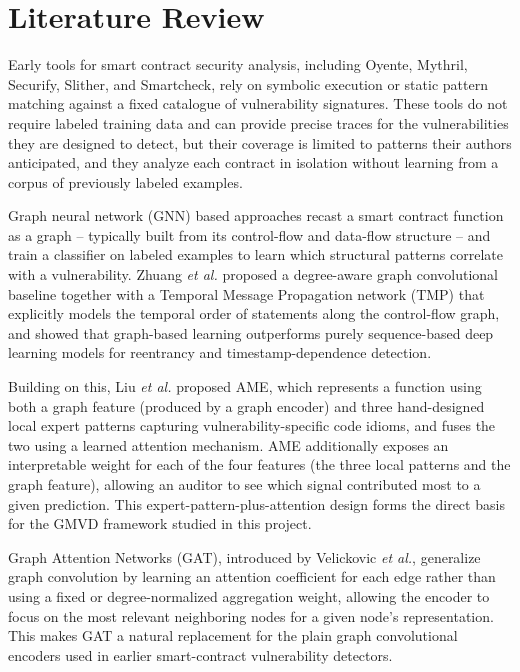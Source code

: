 \documentclass[12pt, a4paper, openright, twoside]{report}
\begin{document}
\chapter{Literature Review}
\label{literaturereview}
\vspace{3em}

Early tools for smart contract security analysis, including Oyente, Mythril, Securify, Slither, and Smartcheck, rely on symbolic execution or static pattern matching against a fixed catalogue of vulnerability signatures. These tools do not require labeled training data and can provide precise traces for the vulnerabilities they are designed to detect, but their coverage is limited to patterns their authors anticipated, and they analyze each contract in isolation without learning from a corpus of previously labeled examples.

Graph neural network (GNN) based approaches recast a smart contract function as a graph -- typically built from its control-flow and data-flow structure -- and train a classifier on labeled examples to learn which structural patterns correlate with a vulnerability. Zhuang \textit{et al.} proposed a degree-aware graph convolutional baseline together with a Temporal Message Propagation network (TMP) that explicitly models the temporal order of statements along the control-flow graph, and showed that graph-based learning outperforms purely sequence-based deep learning models for reentrancy and timestamp-dependence detection.

Building on this, Liu \textit{et al.} proposed AME, which represents a function using both a graph feature (produced by a graph encoder) and three hand-designed local expert patterns capturing vulnerability-specific code idioms, and fuses the two using a learned attention mechanism. AME additionally exposes an interpretable weight for each of the four features (the three local patterns and the graph feature), allowing an auditor to see which signal contributed most to a given prediction. This expert-pattern-plus-attention design forms the direct basis for the GMVD framework studied in this project.

Graph Attention Networks (GAT), introduced by Velickovic \textit{et al.}, generalize graph convolution by learning an attention coefficient for each edge rather than using a fixed or degree-normalized aggregation weight, allowing the encoder to focus on the most relevant neighboring nodes for a given node's representation. This makes GAT a natural replacement for the plain graph convolutional encoders used in earlier smart-contract vulnerability detectors.
\end{document}
